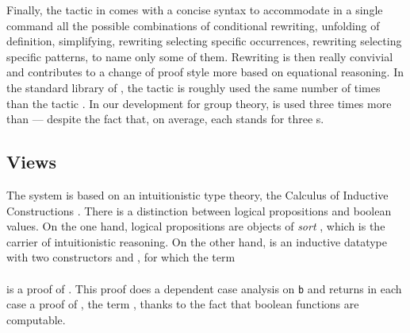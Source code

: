 Finally, the  tactic in \ssr{} comes with a concise syntax to accommodate
in a single command
all the possible combinations of conditional rewriting, unfolding of definition,
simplifying, rewriting selecting specific occurrences, rewriting selecting
specific patterns, to name only some of them. Rewriting is then really convivial 
and contributes to a change of proof style more based on equational reasoning. 
In the standard library of \Coq, the  tactic is roughly used the same number of times
than the tactic  .
In our development for group theory,  is used three times more than
 --- despite the fact that, on average, each \ssr{} 
stands for three \Coq{} s.

\subsection{Views}\label{ssec:ssr}

The \Coq{} system is based on an intuitionistic type theory, the Calculus
of Inductive Constructions \cite{werner,paulin}. There is 
a distinction between logical propositions and boolean values.
On the one hand, logical propositions are objects
of \emph{sort} , which is the carrier of intuitionistic
reasoning. On the other hand,  is an
inductive datatype with two constructors  and , for
which the term \\
\quad{}\\
is a proof of . 
This proof does a dependent case analysis on {\tt b} and
returns in each case a proof of , the term
, thanks to the fact that boolean functions are
computable.


